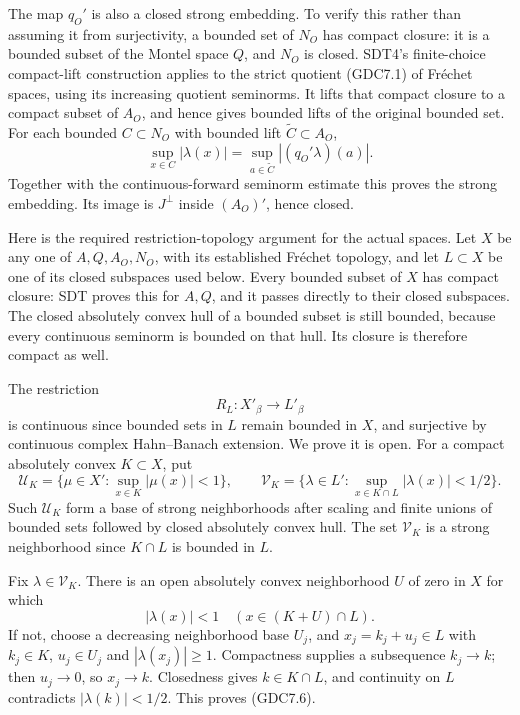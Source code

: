 The map \(q_O'\) is also a closed strong embedding. To verify this
rather than assuming it from surjectivity, a bounded set of \(N_O\) has
compact closure: it is a bounded subset of the Montel space \(Q\), and
\(N_O\) is closed. SDT4's finite-choice compact-lift construction
applies to the strict quotient (GDC7.1) of Fréchet spaces, using its
increasing quotient seminorms. It lifts that compact closure to a
compact subset of \(A_O\), and hence gives bounded lifts of the original
bounded set. For each bounded \(C\subset N_O\) with bounded lift
\(\widetilde C\subset A_O\), \[
\sup_{x\in C}|\lambda(x)|
=\sup_{a\in\widetilde C}|(q_O'\lambda)(a)|.
\tag{GDC7.4}
\] Together with the continuous-forward seminorm estimate this proves
the strong embedding. Its image is \(J^\perp\) inside \((A_O)'\), hence
closed.

Here is the required restriction-topology argument for the actual
spaces. Let \(X\) be any one of \(A,Q,A_O,N_O\), with its established
Fréchet topology, and let \(L\subset X\) be one of its closed subspaces
used below. Every bounded subset of \(X\) has compact closure: SDT
proves this for \(A,Q\), and it passes directly to their closed
subspaces. The closed absolutely convex hull of a bounded subset is
still bounded, because every continuous seminorm is bounded on that
hull. Its closure is therefore compact as well.

The restriction \[
R_L:X'_\beta\longrightarrow L'_\beta
\tag{GDC7.5}
\] is continuous since bounded sets in \(L\) remain bounded in \(X\),
and surjective by continuous complex Hahn--Banach extension. We prove it
is open. For a compact absolutely convex \(K\subset X\), put \[
\mathcal U_K=\{\mu\in X':\sup_{x\in K}|\mu(x)|<1\},\qquad
\mathcal V_K=\{\lambda\in L':\sup_{x\in K\cap L}|\lambda(x)|<1/2\}.
\] Such \(\mathcal U_K\) form a base of strong neighborhoods after
scaling and finite unions of bounded sets followed by closed absolutely
convex hull. The set \(\mathcal V_K\) is a strong neighborhood since
\(K\cap L\) is bounded in \(L\).

Fix \(\lambda\in\mathcal V_K\). There is an open absolutely convex
neighborhood \(U\) of zero in \(X\) for which \[
|\lambda(x)|<1\quad(x\in (K+U)\cap L).
\tag{GDC7.6}
\] If not, choose a decreasing neighborhood base \(U_j\), and
\(x_j=k_j+u_j\in L\) with \(k_j\in K\), \(u_j\in U_j\) and
\(|\lambda(x_j)|\ge1\). Compactness supplies a subsequence \(k_j\to k\);
then \(u_j\to0\), so \(x_j\to k\). Closedness gives \(k\in K\cap L\),
and continuity on \(L\) contradicts \(|\lambda(k)|<1/2\). This proves
(GDC7.6).

